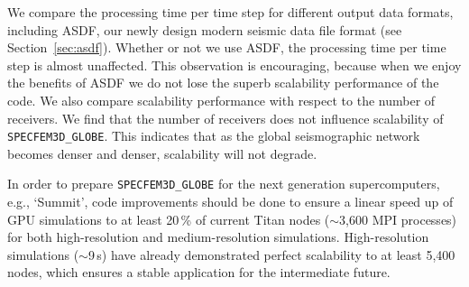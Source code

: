 We compare the processing time per time step for different output data formats,
including ASDF, our newly design modern seismic data file format (see
Section~\ref{sec:asdf}). Whether or not we use ASDF, the
processing time per time step is almost unaffected.
This observation is encouraging, because when we enjoy the benefits of
ASDF we do not lose the superb scalability performance of the code.
We
also compare scalability performance with respect to the number of receivers.
We find that the number of receivers does not influence scalability of 
\texttt{SPECFEM3D\_GLOBE}. This indicates that as the global
seismographic network becomes denser and denser, scalability will not degrade.

In order to prepare \texttt{SPECFEM3D\_GLOBE} for the next generation
supercomputers, e.g., `Summit', code improvements should be done to ensure a
linear speed up of GPU simulations to at least 20\,\% of current Titan nodes
($\sim$3,600 MPI processes) for both high-resolution and medium-resolution
simulations. High-resolution simulations ($\sim$9\,s) have already demonstrated
perfect scalability to at least 5,400 nodes, which ensures a stable
application for the intermediate future. 
